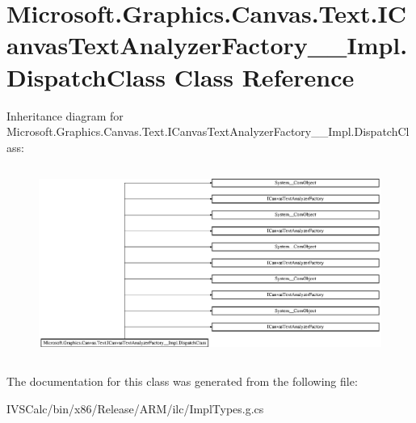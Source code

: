 \hypertarget{class_microsoft_1_1_graphics_1_1_canvas_1_1_text_1_1_i_canvas_text_analyzer_factory_____impl_1_1_dispatch_class}{}\section{Microsoft.\+Graphics.\+Canvas.\+Text.\+I\+Canvas\+Text\+Analyzer\+Factory\+\_\+\+\_\+\+Impl.\+Dispatch\+Class Class Reference}
\label{class_microsoft_1_1_graphics_1_1_canvas_1_1_text_1_1_i_canvas_text_analyzer_factory_____impl_1_1_dispatch_class}
Inheritance diagram for Microsoft.\+Graphics.\+Canvas.\+Text.\+I\+Canvas\+Text\+Analyzer\+Factory\+\_\+\+\_\+\+Impl.\+Dispatch\+Class\+:\begin{figure}[H]
\begin{center}
\leavevmode
\includegraphics[height=6.285715cm]{class_microsoft_1_1_graphics_1_1_canvas_1_1_text_1_1_i_canvas_text_analyzer_factory_____impl_1_1_dispatch_class}
\end{center}
\end{figure}


The documentation for this class was generated from the following file\+:\begin{DoxyCompactItemize}
\item 
I\+V\+S\+Calc/bin/x86/\+Release/\+A\+R\+M/ilc/Impl\+Types.\+g.\+cs\end{DoxyCompactItemize}
